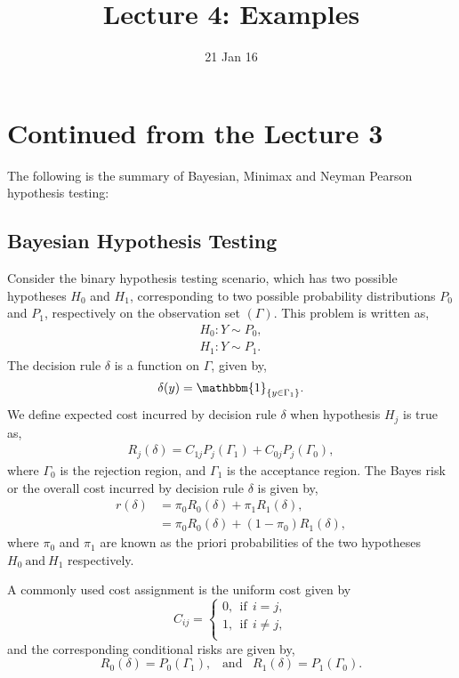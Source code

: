 \documentclass[a4paper,english,12pt]{article}
\title{Lecture 4: Examples}
\date{21 Jan 16}
\begin{document}
\maketitle  
\section{Continued from the Lecture 3}
The following is the summary of Bayesian, Minimax and Neyman Pearson hypothesis testing:
\subsection{Bayesian Hypothesis Testing}
Consider the binary hypothesis testing scenario, which has two possible hypotheses $H_{0}$ and $H_{1}$, corresponding to two possible probability distributions $P_{0}$ and $P_{1}$, respectively on the observation set $(\Gamma)$. This problem is written as,
\begin{eqnarray}
H_{0}:Y\sim P_{0},\\\nonumber
H_{1}:Y\sim P_{1}.
\end{eqnarray}
The decision rule $\delta$ is a function on $\Gamma$, given by,
\begin{eqnarray}
\delta(y)=\mathbbm{1}_{\{y\in\Gamma_{1}\}}.
\end{eqnarray}
We define expected cost incurred by decision rule $\delta$ when hypothesis $H_{j}$ is true as,
\begin{eqnarray}
R_{j}(\delta)= C_{1j}P_{j}(\Gamma_{1})+C_{0j}P_{j}(\Gamma_{0}),
\end{eqnarray}
where $\Gamma_0$ is the rejection region, and $\Gamma_1$ is the  acceptance region. The Bayes risk or the overall cost incurred by decision rule $\delta$ is given by,
\begin{align}
r(\delta)&= \pi_{0}R_{0}(\delta)+\pi_{1}R_{1}(\delta),\nonumber\\
         &= \pi_{0}R_{0}(\delta)+(1-\pi_{0})R_{1}(\delta),
\end{align} 
where $\pi_{0}$ and $\pi_{1}$ are known as the priori probabilities of the two hypotheses $H_0~\mbox{and}~H_1$ respectively.
\par A commonly used cost assignment is the uniform cost given by
\begin{equation}
C_{ij}= 
		\begin{cases}
		0,~~\mbox{if}~~i=j,\\
		1,~~\mbox{if}~~i\neq j,\\
		\end{cases}
\end{equation}
and the corresponding conditional risks are given by,
\begin{equation}		
  R_{0}(\delta)=P_{0}(\Gamma_{1}),\hspace{10pt}\mbox{and}\hspace{10pt}
  R_{1}(\delta)=P_{1}(\Gamma_{0}).\nonumber     
\end{equation}
\end{document}
